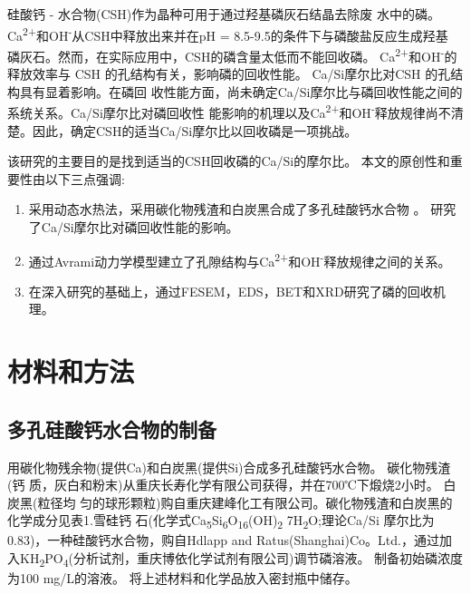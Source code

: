 \documentclass[11pt]{article}
\begin{document}
硅酸钙 - 水合物(CSH)作为晶种可用于通过羟基磷灰石结晶去除废
水中的磷。\cite{battistoni01_phosp_remov_from_real_anaer} Ca\textsuperscript{2+}和OH\textsuperscript{-}从CSH中释放出来并在pH = 8.5-9.5的条件下与磷酸盐反应生成羟基
磷灰石。然而，在实际应用中，CSH的磷含量太低而不能回收磷。
\cite{renman10_long_term_phosp_remov_by,de-bashan04_recen_advan_remov_phosp_from}  Ca\textsuperscript{2+}和OH\textsuperscript{-}的释放效率与
CSH \cite{yin11_phosp_remov_from_wastew_by} 的孔结构有关，影响磷的回收性能。
\cite{westholm06_subst_phosp_remov_poten_benef,baur04_dissol_precip_behav_ettrin_monos}
Ca/Si摩尔比对CSH
\cite{chen04_solub_struc_calcium_silic_hydrat,soyer-uzun11_compos_evolut_calcium_silic_hydrat,richardson04_tober_tober_hydrox_based_model}
的孔结构具有显着影响。在磷回
收性能方面，尚未确定Ca/Si摩尔比与磷回收性能之间的系统关系。Ca/Si摩尔比对磷回收性
能影响的机理以及Ca\textsuperscript{2+}和OH\textsuperscript{-}释放规律尚不清楚。因此，确定CSH的适当Ca/Si摩尔比以回收磷是一项挑战。

该研究的主要目的是找到适当的CSH回收磷的Ca/Si的摩尔比。 本文的原创性和重要性由以下三点强调:
\begin{enumerate}
\item 采用动态水热法，采用碳化物残渣和白炭黑合成了多孔硅酸钙水合物
\cite{li04_format_micro_porous_spher_partic,mansur10_prepar_charac_cytoc_bioac_coatin} 。 研究了Ca/Si摩尔比对磷回收性能的影响。
\item 通过Avrami动力学模型建立了孔隙结构与Ca\textsuperscript{2+}和OH\textsuperscript{-}释放规律之间的关系。
\item 在深入研究的基础上，通过FESEM，EDS，BET和XRD研究了磷的回收机理。
\end{enumerate}

\section{材料和方法}
\label{sec:org21597f1}
\subsection{多孔硅酸钙水合物的制备}
\label{sec:orgeb6fe17}
用碳化物残余物(提供Ca)和白炭黑(提供Si)合成多孔硅酸钙水合物。 碳化物残渣(钙
质，灰白和粉末)从重庆长寿化学有限公司获得，并在700℃下煅烧2小时。 白炭黑(粒径均
匀的球形颗粒)购自重庆建峰化工有限公司。碳化物残渣和白炭黑的化学成分见表1.雪硅钙
石(化学式Ca\textsubscript{5}Si\textsubscript{6}O\textsubscript{16}(OH)\textsubscript{2} \dot 7H\textsubscript{2}O;理论Ca/Si 摩尔比为0.83)，一种硅酸钙水合物，购自Hdlapp and Ratus(Shanghai)Co。Ltd.，通过加入KH\textsubscript{2}PO\textsubscript{4}(分析试剂，重庆博依化学试剂有限公司)调节磷溶液。 制备初始磷浓度为100 mg/L的溶液。 将上述材料和化学品放入密封瓶中储存。
\end{document}

